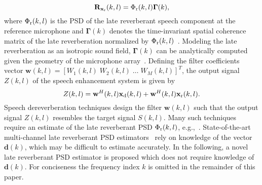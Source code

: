 \documentclass{article}
\begin{document}
\begin{equation}
\label{eq: corr_rev}
\mathbf{R}_{{\mathbf{x}}_{\rm r}}(k,l) = \Phi_{\rm r}(k,l){\boldsymbol{\Gamma}}(k),
\end{equation}
where $\Phi_{\rm r}(k,l)$ is the PSD of the late reverberant speech component at the reference microphone and ${\boldsymbol{\Gamma}}(k)$ denotes the time-invariant spatial coherence matrix of the late reverberation normalized by $\Phi_{\rm r}(k,l)$~\cite{Braun_EUSIPCO_2013,Kuklasinski_EUSIPCO_2014g,Kuklasinksi_ICASSP_2015,Braun_EURASIP_2015,Schwartz_WASPAA_2015,Schwartz_ICASSP_2016,Kuklasinski_ITASLP_2016,kuklasinski_AES_2016}.
Modeling the late reverberation as an isotropic sound field, ${\boldsymbol{\Gamma}}(k)$ can be analytically computed given the geometry of the microphone array~\cite{Braun_EUSIPCO_2013,Braun_EURASIP_2015,Schwartz_WASPAA_2015,Schwartz_ICASSP_2016}.
Defining the filter coefficients vector $\mathbf{w}(k,l) = [W_1(k,l) \; W_2(k,l) \; \ldots \; W_M(k,l)]^T$, the output signal $Z(k,l)$ of the speech enhancement system is given by
\begin{equation}
Z(k,l) = \mathbf{w}^H(k,l)\mathbf{x}_{\rm d}(k,l) + \mathbf{w}^H(k,l)\mathbf{x}_{\rm r}(k,l).
\end{equation}
Speech dereverberation techniques design the filter $\mathbf{w}(k,l)$ such that the output signal $Z(k,l)$ resembles the target signal $S(k,l)$.
Many such techniques require an estimate of the late reverberant PSD $\Phi_{\rm r}(k,l)$, e.g.,~\cite{Braun_EUSIPCO_2013,Kuklasinski_EUSIPCO_2014g,OSchwartz_ITASLP_2015}.
State-of-the-art multi-channel late reverberant PSD estimators~\cite{Braun_EUSIPCO_2013,Kuklasinski_EUSIPCO_2014g,Braun_EURASIP_2015,Schwartz_WASPAA_2015,Schwartz_ICASSP_2016,Kuklasinski_ITASLP_2016} rely on knowledge of the vector $\mathbf{d}(k)$, which may be difficult to estimate accurately.
In the following, a novel late reverberant PSD estimator is proposed which does not require knowledge of $\mathbf{d}(k)$.
For conciseness the frequency index $k$ is omitted in the remainder of this paper.
\end{document}
